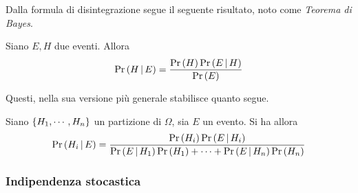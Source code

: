 \documentclass{subfiles}
\begin{document}
Dalla formula di disintegrazione segue il seguente risultato, noto come \emph{Teorema di Bayes}.
\begin{Theorem*}[di Bayes]
    Siano \(E, H\) due eventi. Allora
    \[
        \Prob{H}[E] = \Frac{\Prob{H} \Prob{E}[H]}{\Prob{E}}
    \]
\end{Theorem*}
Questi, nella sua versione più generale stabilisce quanto segue.
\begin{Theorem*}
    Siano \(\Set{H_{1}, \cdots, H_{n}}\) un partizione di \(\Omega\), sia \(E\) un evento.
    Si ha allora
    \[
        \Prob{H_{i}}[E] = \Frac{\Prob{H_{i}} \Prob{E}[H_{i}]}{\Prob{E}[H_{1}] \Prob{H_{1}} + \cdots + \Prob{E}[H_{n}] \Prob{H_{n}}}
    \]
\end{Theorem*}

\subsubsection{Indipendenza stocastica}

\end{document}
